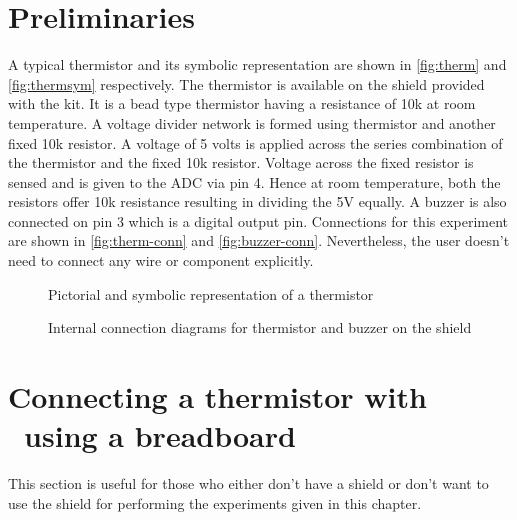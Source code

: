 \section{Preliminaries}
A typical thermistor and its symbolic representation are shown in
\ref{fig:therm} and \ref{fig:thermsym} respectively. The thermistor is
available on the shield provided with the kit.  It is a bead type
thermistor having a resistance of 10k at room temperature. A voltage
divider network is formed using thermistor and another fixed 10k
resistor. A voltage of 5 volts is applied across the series
combination of the thermistor and the fixed 10k resistor. Voltage
across the fixed resistor is sensed and is given to the ADC via pin
4. Hence at room temperature, both the resistors offer 10k resistance
resulting in dividing the 5V equally. A buzzer is also connected on
pin 3 which is a digital output pin.
Connections for this experiment are shown in \ref{fig:therm-conn}
and \ref{fig:buzzer-conn}.  Nevertheless, the user doesn't need to
connect any wire or component explicitly.


\begin{figure}
  \centering
   \hfill
  \caption{Pictorial and symbolic representation of a thermistor}
\end{figure}


\begin{figure}
  \centering
   \hfill
  \caption{Internal connection diagrams for thermistor and buzzer on the shield}
\end{figure}

\section{Connecting a thermistor with \arduino\ using a breadboard}
This section is useful for those who either don't have a shield or don't want to use the shield
for performing the experiments given in this chapter.

